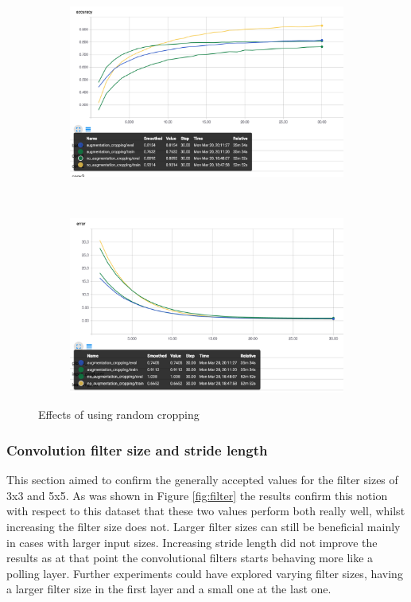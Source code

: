 \documentclass[12pt]{article}
\begin{document}
\begin{figure}[ht!]
    \centering
    \begin{subfigure}[t]{0.475\textwidth}
        \centering
        \includegraphics[width=1.0\linewidth]{disauga.png}
    \end{subfigure}%
    ~ 
    \begin{subfigure}[t]{0.475\textwidth}
        \centering
        \includegraphics[width=1.0\linewidth]{disauge.png}
    \end{subfigure}
    \caption{Effects of using random cropping}
    \label{fig:augcomp}
\end{figure}

\subsubsection*{Convolution filter size and stride length}

This section aimed to confirm the generally accepted values\cite{kernel}\cite{inspiration}\cite{bestprac} for the filter sizes of 3x3 and 5x5. As was shown in Figure \ref{fig:filter} the results confirm this notion with respect to this dataset that these two values perform both really well, whilst increasing the filter size does not. Larger filter sizes can still be beneficial\cite{alexnet} mainly in cases with larger input sizes. Increasing stride length did not improve the results as at that point the convolutional filters starts behaving more like a polling layer. Further experiments could have explored varying filter sizes, having a larger filter size in the first layer and a small one at the last one. 
\end{document}
